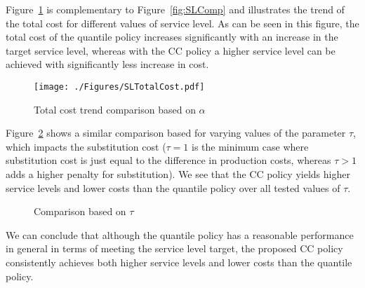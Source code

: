 \documentclass[msom]{oo}
\begin{document}
Figure~\ref{fig:SLTotalCost} is complementary to Figure~\ref{fig:SLComp} and illustrates the trend of the total cost for different values of service level. As can be seen in this figure, the total cost of the quantile policy increases significantly with an increase in the target service level, whereas with the CC policy a higher service level can be achieved with significantly less increase in cost.
\begin{figure}[ht]
\begin{center}
\texttt{[image: ./Figures/SLTotalCost.pdf]}
\caption{Total cost trend comparison based on $\alpha$} 
\label{fig:SLTotalCost}
\end{center}
\end{figure}

Figure~\ref{fig:TIComp} shows a similar comparison based for varying values of the parameter $\tau$,  which impacts the substitution cost ($\tau=1$ is the minimum case where substitution cost is just equal to the difference in production costs, whereas $\tau >1$ adds a higher penalty for substitution). We see that the CC policy yields higher service levels and lower costs than the quantile policy over all tested values of $\tau$.
\begin{figure}[ht]
    \centering
    \caption{Comparison based on $\tau$}%
    \label{fig:TIComp}%
\end{figure}

We can conclude that although the quantile policy has a reasonable performance in general in terms of meeting the service level target,  the proposed CC policy consistently achieves both higher service levels and lower costs than the quantile policy.
\end{document}
